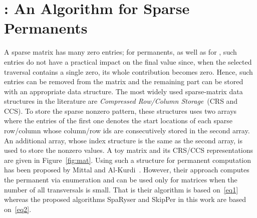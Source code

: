 \documentclass{elektr}
\begin{document}
\section{{}: An Algorithm for Sparse Permanents} \label{sec:spa}

A sparse matrix has many zero entries; for permanents, as well as for {}, such entries do not have a practical impact on the final value since, when the selected traversal contains a single zero, its whole contribution becomes zero. Hence, such entries can be removed from the matrix and the remaining part can be stored with an appropriate data structure. The most widely used sparse-matrix data structures in the literature are {\em Compressed Row/Column Storage}~(CRS and CCS). To store the sparse nonzero pattern, these structures uses two arrays where the entries of the first one denotes the start locations of each sparse row/column whose column/row ids are consecutively stored in the second array. An additional array, whose index structure is the same as the second array, is used to store the nonzero values. A toy matrix and its CRS/CCS representations are given in Figure~\ref{fig:mat}. Using such a structure for permanent computation has been proposed by Mittal and Al-Kurdi~\cite{mittal01}. However, their approach computes the permanent via enumeration and can be used only for matrices when the number of all transversals is small. That is their algorithm is based on~\eqref{eq1} whereas the proposed algorithms {\sc SpaRyser} and {\sc SkipPer} in this work  are based on~\eqref{eq2}. 
\end{document}
